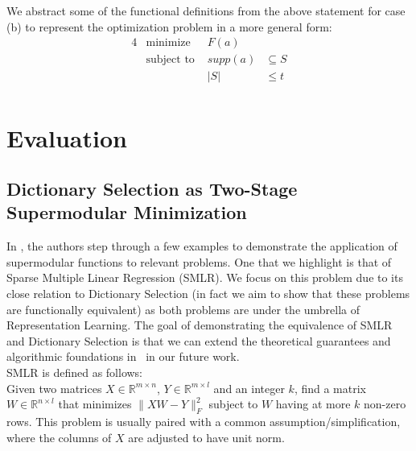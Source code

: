 \documentclass{article}
\newcommand{\R}{\mathbb{R}}
\begin{document}
\noindent We abstract some of the functional definitions from the above statement for case (b) to represent the optimization problem in a more general form:
\begin{alignat*}{4}
    &\text{minimize }   & F(a) & \\
    &\text{subject to } & \textit{supp}(a)&\subseteq S\\
    &                   & |S|  &\leq t\\
\end{alignat*}


\section{Evaluation}\label{sec:eval}

\subsection{Dictionary Selection as Two-Stage Supermodular Minimization} \label{supermodTwoStage}

In \cite{BoutsidisLS15}, the authors step through a few examples to demonstrate the application of supermodular functions to relevant problems. One that we highlight is that of Sparse Multiple Linear Regression (SMLR). We focus on this problem due to its close relation to Dictionary Selection (in fact we aim to show that these problems are functionally equivalent) as both problems are under the umbrella of Representation Learning. The goal of demonstrating the equivalence of SMLR and Dictionary Selection is that we can extend the theoretical guarantees and algorithmic foundations in~\cite{BoutsidisLS15} in our future work. 
\\

\noindent SMLR is defined as follows:\\
Given two matrices $X\in\R^{m\times n}$, $Y\in\R^{m\times l}$ and an integer $k$, find a matrix  $W\in\R^{n\times l}$ that minimizes $\|XW-Y\|^2_F$ subject to $W$ having at more $k$ non-zero rows. This problem is usually paired with a common assumption/simplification, where the columns of $X$ are adjusted to have unit norm.
\\
\end{document}
